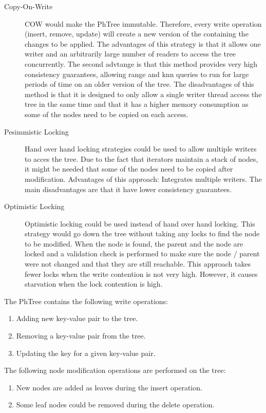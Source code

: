 \documentclass[11pt,a4paper]{globis-book}
\begin{document}
\begin{description}
    \item[Copy-On-Write] COW would make the PhTree immutable. Therefore, every
        write operation (insert, remove, update) will create a new version of
        the containing the changes to be applied. The advantages of this
        strategy is that it allows one writer and an arbitrarily large number
        of readers to access the tree concurrently. The second advtange is
        that this method provides very high consistency guarantees, allowing
        range and knn queries to run for large periods of time on an older
        version of the tree. The disadvantages of this method is that it is
        designed to only allow a single writer thread access the tree in the
        same time and that it has a higher memory consumption as some of the
        nodes need to be copied on each access.
    \item[Pesimmistic Locking] Hand over hand locking strategies could be used
        to allow multiple writers to acces the tree. Due to the fact that
        iterators maintain a stack of nodes, it might be needed that some of
        the nodes need to be copied after modification. 
        Advantages of this approach: Integrates multiple writers. The main
        disadvantages are that it have lower consistency guarantees.
    \item[Optimistic Locking] Optimistic locking could be used instead of hand
        over hand locking. This strategy would go down the tree without taking
        any locks to find the node to be modified. When the node is found, the
        parent and the node are locked and a validation check is performed to
        make sure the node / parent were not changed and that they are still
        reachable. This approach takes fewer locks when the write contention
        is not very high. However, it causes starvation when the lock
        contention is high.
\end{description}

The PhTree contains the following write operations:
\begin{enumerate}
    \item Adding new key-value pair to the tree.
    \item Removing a key-value pair from the tree.
    \item Updating the key for a given key-value pair.
\end{enumerate}

The following node modification operations are performed on the tree:
\begin{enumerate}
    \item New nodes are added as leaves during the insert operation.
    \item Some leaf nodes could be removed during the delete operation.
\end{enumerate}
\end{document}
